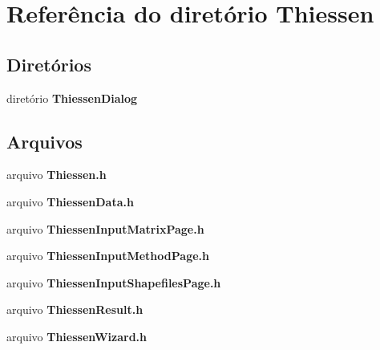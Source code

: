 \section{Referência do diretório Thiessen}
\label{dir_030cc227d1c1914784e6976fa8b8fd88}
\subsection*{Diretórios}
\begin{DoxyCompactItemize}
\item 
diretório {\bf Thiessen\+Dialog}
\end{DoxyCompactItemize}
\subsection*{Arquivos}
\begin{DoxyCompactItemize}
\item 
arquivo {\bf Thiessen.\+h}
\item 
arquivo {\bf Thiessen\+Data.\+h}
\item 
arquivo {\bf Thiessen\+Input\+Matrix\+Page.\+h}
\item 
arquivo {\bf Thiessen\+Input\+Method\+Page.\+h}
\item 
arquivo {\bf Thiessen\+Input\+Shapefiles\+Page.\+h}
\item 
arquivo {\bf Thiessen\+Result.\+h}
\item 
arquivo {\bf Thiessen\+Wizard.\+h}
\end{DoxyCompactItemize}
